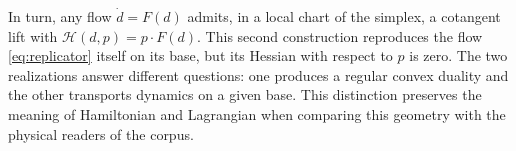 In turn, any flow \(\dot d=F(d)\) admits, in a local chart
of the simplex, a cotangent lift with
\(\mathscr H(d,p)=p\cdot F(d)\). This second construction reproduces
the flow \eqref{eq:replicator} itself on its base, but its Hessian with respect
to \(p\) is zero. The two realizations answer different questions:
one produces a regular convex duality and the other transports dynamics
on a given base. This distinction preserves the meaning of Hamiltonian and
Lagrangian when comparing this geometry with the physical readers of the corpus.
